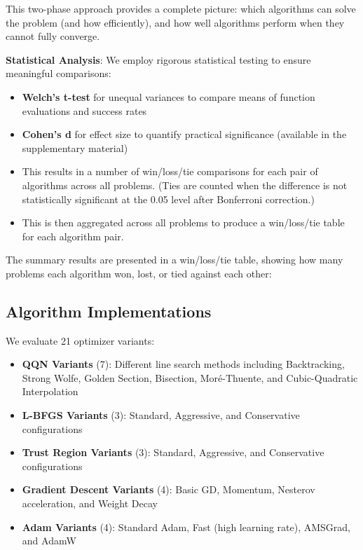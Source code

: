 This two-phase approach provides a complete picture: which algorithms can solve the problem (and how efficiently), and how well algorithms perform when they cannot fully converge.

\textbf{Statistical Analysis}: We employ rigorous statistical testing to ensure meaningful comparisons:

\begin{itemize}
\tightlist
\item
  \textbf{Welch's t-test} for unequal variances to compare means of function evaluations and success rates
\item
  \textbf{Cohen's d} for effect size to quantify practical significance (available in the supplementary material)
\item
  This results in a number of win/loss/tie comparisons for each pair of algorithms across all problems. (Ties are counted when the difference is not statistically significant at the 0.05 level after Bonferroni correction.)
\item
  This is then aggregated across all problems to produce a win/loss/tie table for each algorithm pair.
\end{itemize}

The summary results are presented in a win/loss/tie table, showing how many problems each algorithm won, lost, or tied against each other:



\hypertarget{algorithm-implementations}{%
\subsection{Algorithm Implementations}\label{algorithm-implementations}}

We evaluate 21 optimizer variants:

\begin{itemize}
\tightlist
\item
  \textbf{QQN Variants} (7): Different line search methods including Backtracking, Strong Wolfe, Golden Section, Bisection, Moré-Thuente, and Cubic-Quadratic Interpolation
\item
  \textbf{L-BFGS Variants} (3): Standard, Aggressive, and Conservative configurations
\item
  \textbf{Trust Region Variants} (3): Standard, Aggressive, and Conservative configurations
\item
  \textbf{Gradient Descent Variants} (4): Basic GD, Momentum, Nesterov acceleration, and Weight Decay
\item
  \textbf{Adam Variants} (4): Standard Adam, Fast (high learning rate), AMSGrad, and AdamW
\end{itemize}

